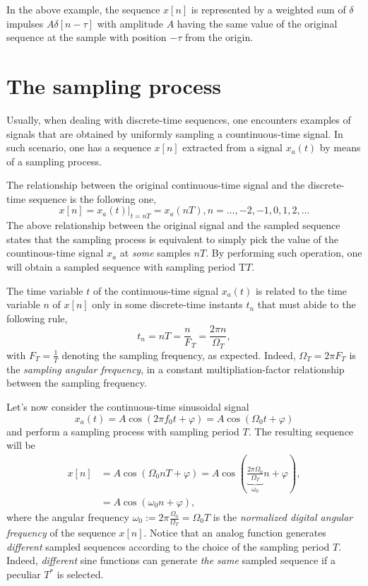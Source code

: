 \documentclass[\documentfontsize, twocolumn]{\classname}
\begin{document}
In the above example, the se\-quen\-ce $x[n]$ is represented by a weighted sum of $\delta$ impulses $A\delta[n-\tau]$ with amplitude $A$ having the same value of the original se\-quen\-ce at the sample with position $-\tau$ from the origin.


\section{The sampling process}

Usually, when dealing with discrete-time se\-quen\-ces, one encounters examples of signals that are obtained by uniformly sampling a countinuous-time signal. In such scenario, one has a se\-quen\-ce $x[n]$ extracted from a signal $x_a(t)$ by means of a sampling process.

The relationship between the original con\-ti\-nuo\-us-time signal and the discrete-time se\-quen\-ce is the following one,
\[
    x[n] = x_a(t)\Bigr\rvert_{t=nT} = x_a(nT), n = \dots,-2,-1,0,1,2,\dots
\]
The above relationship between the original signal and the sampled se\-quen\-ce states that the sampling process is equivalent to simply pick the value of the countinous-time signal $x_a$ at \emph{some} samples $nT$. By performing such operation, one will obtain a sampled se\-quen\-ce with sampling period T$T$.

The time variable $t$ of the con\-ti\-nuo\-us-time signal $x_a(t)$ is related to the time variable $n$ of $x[n]$ only in some discrete-time instants $t_n$ that must abide to the following rule,
\begin{equation}\label{eqn:timeSamplingRule}
    t_n = nT = \frac n F_T = \frac {2\pi n} {\Omega_T},
\end{equation}
with $F_T = \frac 1 T$ denoting the sampling frequency, as expected. Indeed, $\Omega_T = 2\pi F_T$ is the \emph{sampling angular frequency}, in a constant multipliation-factor relationship between the sampling frequency.

Let's now consider the con\-ti\-nuo\-us-time sinusoidal signal
\[
    x_a(t) = A\cos{(2\pi f_0 t + \varphi)} = A\cos{(\Omega_0 t + \varphi)}
\]
and perform a sampling process with sampling period $T$. The resulting se\-quen\-ce will be 
\begin{align}
    x[n] &= A\cos{(\Omega_0 n T + \varphi)} = A\cos{(\underbrace{\frac{2\pi \Omega_0}{\Omega_T}}_{\omega_0} n + \varphi)}, \\
         &= A\cos{(\omega_0 n + \varphi)},
\end{align}
where the angular frequency $\omega_0 := 2 \pi \frac {\Omega_0} {\Omega_T} = \Omega_0 T$ is the \emph{normalized digital angular frequency} of the se\-quen\-ce $x[n]$. Notice that an analog function generates \emph{different} sampled se\-quen\-ces according to the choice of the sampling period $T$. Indeed, \emph{different} sine functions can generate \emph{the same} sampled se\-quen\-ce if a peculiar $T^*$ is selected.
\end{document}
